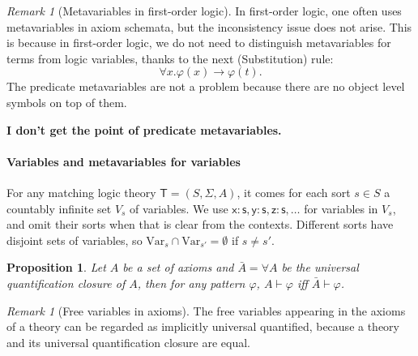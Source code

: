 \documentclass[UTF8]{article}
\newcommand{\comment}[1]
    {\par {\bfseries \color{blue} #1 \par}} %
\newcounter{thmcounter}
\theoremstyle{plain}
\newtheorem{proposition}[thmcounter]{Proposition}
\theoremstyle{definition}
\theoremstyle{remark}
\newtheorem{remark}[thmcounter]{Remark}
\begin{document}
\begin{remark}[Metavariables in first-order logic]
In first-order logic, one often uses metavariables in axiom schemata, but the inconsistency issue does not arise. This is because in first-order logic, we do not need to distinguish metavariables for terms from logic variables, thanks to the next (Substitution) rule:
\begin{equation*}
\forall x . \varphi(x) \to \varphi(t).
\end{equation*}
The predicate metavariables are not a problem because there are no object level symbols on top of them. \comment{I don't get the point of predicate metavariables.}
\end{remark}

\paragraph{Variables and metavariables for variables}

For any matching logic theory $\mathsf{T} = (S, \Sigma, A)$, it comes for each sort $s \in S$ a countably infinite set $V_s$ of variables. We use $\mathsf{x:s}, \mathsf{y:s}, \mathsf{z:s}, \dots$ for variables in $V_s$, and omit their sorts when that is clear from the contexts. Different sorts have disjoint sets of variables, so $\mathrm{Var}_s \cap \mathrm{Var}_{s'} = \emptyset$ if $s \neq s'$.



\begin{proposition}
\label{prop:explicitly_universal_quantified_justification}
Let $A$ be a set of axioms and $\bar{A} = \forall A$ be the universal quantification closure of $A$, then for any pattern $\varphi$, $A \vdash \varphi$ iff $\bar{A} \vdash \varphi$.
\end{proposition}

\begin{remark}[Free variables in axioms]
\label{rmk:free_variables_in_axioms_are_universal_quantified}
The free variables appearing in the axioms of a theory can be regarded as implicitly universal quantified, because a theory and its universal quantification closure are equal.
\end{remark}
\end{document}
